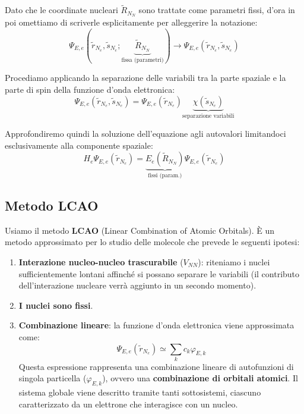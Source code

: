 Dato che le coordinate nucleari \(\tilde{R}_{N_N}\) sono trattate come parametri fissi, d'ora in poi omettiamo di scriverle esplicitamente per alleggerire la notazione:
\begin{equation}
    \Psi_{E,e}(\tilde{r}_{N_e}, \tilde{s}_{N_e} ; \underbrace{\tilde{R}_{N_N}}_{\text{fissa (parametri)}}) \longrightarrow \Psi_{E,e}(\tilde{r}_{N_e}, \tilde{s}_{N_e})
\end{equation}

Procediamo applicando la separazione delle variabili tra la parte spaziale e la parte di spin della funzione d'onda elettronica:
\begin{equation}
    \Psi_{E,e}(\tilde{r}_{N_e}, \tilde{s}_{N_e}) = \Psi_{E,e}(\tilde{r}_{N_e}) \underbrace{\chi(\tilde{s}_{N_e})}_{\text{separazione variabili}}
\end{equation}

Approfondiremo quindi la soluzione dell'equazione agli autovalori limitandoci esclusivamente alla componente spaziale:
\begin{equation}
    H_e \Psi_{E,e}(\tilde{r}_{N_e}) = \underbrace{E_e(\tilde{R}_{N_N})}_{\text{fissi (param.)}} \Psi_{E,e}(\tilde{r}_{N_e})
\end{equation}

\subsection{Metodo LCAO}

Usiamo il metodo \textbf{LCAO} (Linear Combination of Atomic Orbitals).
È un metodo approssimato per lo studio delle molecole che prevede le seguenti ipotesi:

\begin{enumerate}
    \item \textbf{Interazione nucleo-nucleo trascurabile} (\( V_{NN} \)): riteniamo i nuclei sufficientemente lontani affinché si possano separare le variabili (il contributo dell'interazione nucleare verrà aggiunto in un secondo momento).
    
    \item \textbf{I nuclei sono fissi}.
    
    \item \textbf{Combinazione lineare}: la funzione d'onda elettronica viene approssimata come:
    \begin{equation}
        \Psi_{E,e}(\tilde{r}_{N_e}) \simeq \sum_k c_k \varphi_{E,k}
    \end{equation}
    Questa espressione rappresenta una combinazione lineare di autofunzioni di singola particella (\(\varphi_{E,k}\)), ovvero una \textbf{combinazione di orbitali atomici}. Il sistema globale viene descritto tramite tanti sottosistemi, ciascuno caratterizzato da un elettrone che interagisce con un nucleo.
\end{enumerate}

